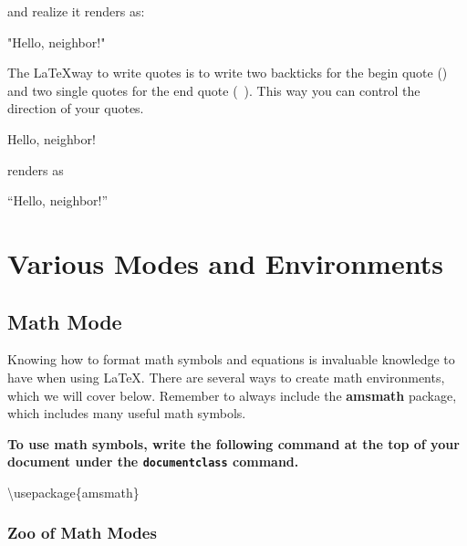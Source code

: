 \documentclass[11pt,onecolumn]{article}
\theoremstyle{definition}
\begin{document}
and realize it renders as:

"Hello, neighbor!"

The \LaTeX way to write quotes is to write two backticks for the begin quote (\textasciigrave \textasciigrave) and two single quotes for the end quote (\textquotesingle\ \textquotesingle). This way you can control the direction of your quotes.

\begin{tcolorbox}
\textasciigrave\textasciigrave Hello, neighbor!\textquotesingle\textquotesingle
\end{tcolorbox}

renders as

``Hello, neighbor!''

\pagebreak 
\section{Various Modes and Environments}

\subsection{Math Mode}

Knowing how to format math symbols and equations is invaluable knowledge to have when using \LaTeX. There are several ways to create math environments, which we will cover below. Remember to always include the \textbf{amsmath} package, which includes many useful math symbols.

\textbf{To use math symbols, write the following command at the top of your document under the \texttt{documentclass} command.}

\begin{tcolorbox}
\textbackslash usepackage\{amsmath\}
\end{tcolorbox}

\subsubsection{Zoo of Math Modes}
\end{document}

